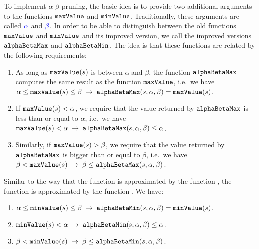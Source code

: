 To implement $\alpha$-$\beta$-pruning, the basic idea is to provide two additional arguments to the functions
$\texttt{maxValue}$ and $\texttt{minValue}$.  Traditionally, these arguments are called ${\color{blue}\alpha}$ and ${\color{blue}\beta}$.  In order to be able to
distinguish between the old functions $\texttt{maxValue}$ and  $\texttt{minValue}$ and its
improved version, we call the improved versions  
$\texttt{alphaBetaMax}$ and $\texttt{alphaBetaMin}$.  The idea is that these functions are
related by the following requirements: 
\begin{enumerate}
\item As long as $\texttt{maxValue}(s)$ is between $\alpha$ and $\beta$, the function
      $\texttt{alphaBetaMax}$ computes the same result as the function $\texttt{maxValue}$,
      i.e.~we have
      \\[0.2cm]
      \hspace*{0.3cm}
      $\alpha \leq \texttt{maxValue}(s) \leq \beta \;\rightarrow\;
         \texttt{alphaBetaMax}(s, \alpha, \beta) = \texttt{maxValue}(s)
      $.
\item If $\texttt{maxValue}(s) < \alpha$, we require that the value returned by
      $\texttt{alphaBetaMax}$ is less than or equal to $\alpha$, i.e.~we have 
      \\[0.2cm]
      \hspace*{0.3cm}
      $\texttt{maxValue}(s) < \alpha \;\rightarrow\; \texttt{alphaBetaMax}(s, \alpha, \beta) \leq \alpha$.
\item Similarly, if $\texttt{maxValue}(s) > \beta$, we require that the value
      returned by $\texttt{alphaBetaMax}$ is bigger than or equal to $\beta$, i.e.~we have 
      \\[0.2cm]
      \hspace*{0.3cm}
      $\beta < \texttt{maxValue}(s) \;\rightarrow\; \beta \leq \texttt{alphaBetaMax}(s, \alpha, \beta)$.
\end{enumerate}
Similar to the way that the function  is approximated by the function ,
the function  is approximated by the function .  We have: 
\begin{enumerate}
\item $\alpha \leq \texttt{minValue}(s) \leq \beta \;\rightarrow\;
         \texttt{alphaBetaMin}(s, \alpha, \beta) = \texttt{minValue}(s)
      $.
\item $\texttt{minValue}(s) < \alpha \;\rightarrow\; \texttt{alphaBetaMin}(s, \alpha, \beta) \leq \alpha$.
\item $\beta < \texttt{minValue}(s) \;\rightarrow\; \beta \leq \texttt{alphaBetaMin}(s, \alpha, \beta)$.
\end{enumerate}
